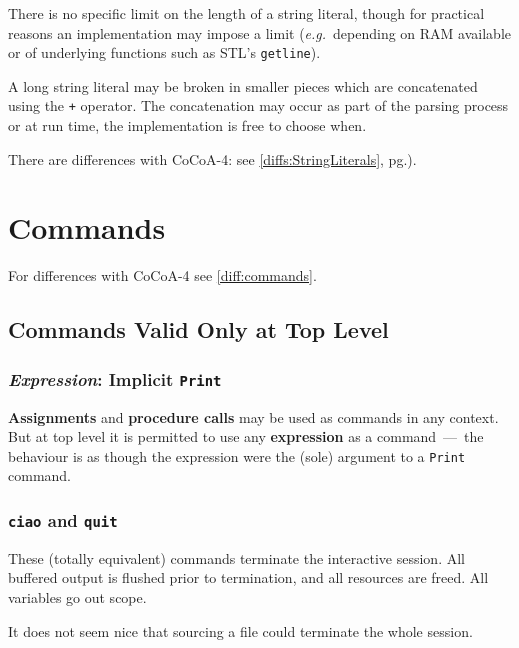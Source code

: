 \documentclass{book}[12,a4paper]
\def\eg{{\it e.g.}}
\begin{document}
There is no specific limit on the length of a string literal, though for
practical reasons an implementation may impose a limit
(\eg~depending on RAM available or  of underlying functions
such as STL's \texttt{getline}).

A long string literal may be broken in smaller pieces which are concatenated
using the \texttt{+} operator.  The concatenation may occur as part of the
parsing process or at run time, the implementation is free to choose when.

There are differences with CoCoA-4: see \ref{diffs:StringLiterals},
pg.\pageref{diffs:StringLiterals}).


\chapter{Commands}

For differences with CoCoA-4 see \ref{diff:commands}.

\section{Commands Valid Only at Top Level}

\subsection{\textit{Expression}: Implicit \texttt{Print}}

\textbf{Assignments} and \textbf{procedure calls} may be used as
commands in any context.  But at top level it is permitted to use any
\textbf{expression} as a command~---~the behaviour is as though the
expression were the (sole) argument to a \texttt{Print} command.

\subsection{\texttt{ciao} and \texttt{quit}}

These (totally equivalent) commands terminate the interactive session.
All buffered output is flushed prior to termination, and all
resources are freed.  All variables go out scope.

It does not seem nice that sourcing a file could terminate the whole session.
\end{document}
